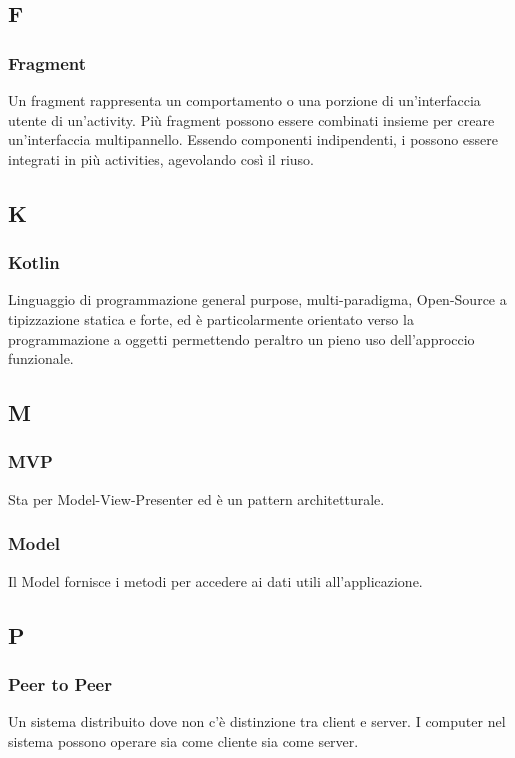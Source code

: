 \subsection*{F}
\subsubsection*{Fragment}
Un fragment rappresenta un comportamento o una porzione di un'interfaccia utente di un'activity. Più fragment possono essere combinati insieme per creare un'interfaccia multipannello. Essendo componenti indipendenti, i possono essere integrati in più activities, agevolando così il riuso.


\subsection*{K}
\subsubsection*{Kotlin}
Linguaggio di programmazione general purpose, multi-paradigma, Open-Source a tipizzazione statica e forte, ed è particolarmente orientato verso la programmazione a oggetti permettendo
peraltro un pieno uso dell'approccio funzionale.

\subsection*{M}
\subsubsection*{MVP}
Sta per Model-View-Presenter ed è un pattern architetturale.
\subsubsection*{Model}
Il Model fornisce i metodi per accedere ai dati utili all'applicazione.

\subsection*{P}
\subsubsection*{Peer to Peer}
Un sistema distribuito dove non c'è distinzione tra client e server. I computer nel sistema possono operare sia come cliente sia come server. 
